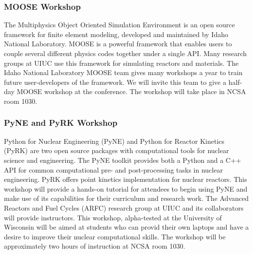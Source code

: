 \subsubsection{MOOSE Workshop}
The Multiphysics Object Oriented Simulation Environment is an open source framework for finite element modeling, developed and maintained by Idaho National Laboratory. MOOSE is a powerful framework that enables users to couple several different physics codes together under a single API. Many research groups at UIUC use this framework for simulating reactors and materials. The Idaho National Laboratory MOOSE team gives many workshops a year to train future user-developers of the framework. We will invite this team to give a half-day MOOSE workshop at the conference. The workshop will take place in NCSA room 1030.

\subsubsection{PyNE and PyRK Workshop}
Python for Nuclear Engineering (PyNE) and Python for Reactor Kinetics (PyRK) are two open source packages with computational tools for nuclear science and engineering. The PyNE toolkit provides both a Python and a C++ API for common computational pre- and post-processing tasks in nuclear engineering. PyRK offers point kinetics implementation for nuclear reactors. This workshop will provide a hands-on tutorial for attendees to begin using PyNE and make use of its capabilities for their curriculum and research work. The Advanced Reactors and Fuel Cycles (ARFC) research group at UIUC and its collaborators will provide instructors. This workshop, alpha-tested at the University of Wisconsin will be aimed at students who can provid their own laptops and have a desire to improve their nuclear computational skills. The workshop will be approximately two hours of instruction at NCSA room 1030.


